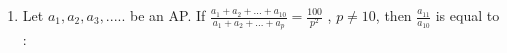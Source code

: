 \documentclass[journal,12pt,twocolumn]{IEEEtran}
\theoremstyle{remark}
\begin{document}
\begin{enumerate}[start=1]
\item 
Let $a_1,a_2,a_3,.....$ be an AP. If $\frac{a_1+a_2+...+a_10}{a_1+a_2+...+a_p}  = \frac{100}{p^2}$ , $p\neq 10$, then $\frac{a_11}{a_10}$ is equal to :
\begin{enumerate}
\end{enumerate}
\begin{enumerate}
\end{enumerate}
\\


\end{enumerate}
\end{document}
